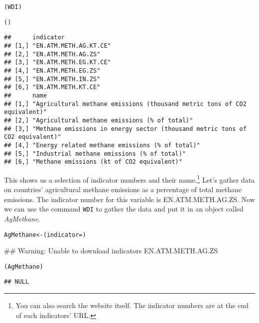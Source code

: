 {\scriptsize
\begin{knitrout}
\color{fgcolor}\begin{kframe}
\begin{alltt}
(WDI)

()
\end{alltt}
\begin{verbatim}
##      indicator             
## [1,] "EN.ATM.METH.AG.KT.CE"
## [2,] "EN.ATM.METH.AG.ZS"   
## [3,] "EN.ATM.METH.EG.KT.CE"
## [4,] "EN.ATM.METH.EG.ZS"   
## [5,] "EN.ATM.METH.IN.ZS"   
## [6,] "EN.ATM.METH.KT.CE"   
##      name                                                                         
## [1,] "Agricultural methane emissions (thousand metric tons of CO2 equivalent)"    
## [2,] "Agricultural methane emissions (% of total)"                                
## [3,] "Methane emissions in energy sector (thousand metric tons of CO2 equivalent)"
## [4,] "Energy related methane emissions (% of total)"                              
## [5,] "Industrial methane emissions (% of total)"                                  
## [6,] "Methane emissions (kt of CO2 equivalent)"
\end{verbatim}
\end{kframe}
\end{knitrout}

}

\noindent This shows us a selection of indicator numbers and their name.\footnote{You can also search the website itself. The indicator numbers are at the end of each indicators' URL.} Let's gather data on countries' agricultural methane emissions as a percentage of total methane emissions. The indicator number for this variable is EN.ATM.METH.AG.ZS. Now we can use the command \texttt{WDI} to gather the data and put it in an object called \emph{AgMethane}.

\begin{knitrout}
\color{fgcolor}\begin{kframe}
\begin{alltt}
AgMethane <- (indicator = )
\end{alltt}


{\ttfamily\noindent\textcolor{warningcolor}{\#\# Warning: Unable to download indicators  EN.ATM.METH.AG.ZS}}\begin{alltt}

(AgMethane)
\end{alltt}
\begin{verbatim}
## NULL
\end{verbatim}
\end{kframe}
\end{knitrout}


